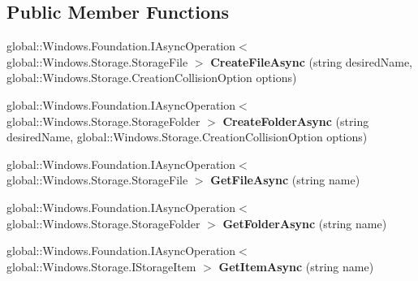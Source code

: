 \subsection*{Public Member Functions}
\begin{DoxyCompactItemize}
\item 
\mbox{\label{interface_windows_1_1_storage_1_1_i_storage_folder_adc3079d2557ccbaaea7a22907fe80ecb}} 
global\+::\+Windows.\+Foundation.\+I\+Async\+Operation$<$ global\+::\+Windows.\+Storage.\+Storage\+File $>$ {\bfseries Create\+File\+Async} (string desired\+Name, global\+::\+Windows.\+Storage.\+Creation\+Collision\+Option options)
\item 
\mbox{\label{interface_windows_1_1_storage_1_1_i_storage_folder_a2ffb245788da50cb1ed88be933be8520}} 
global\+::\+Windows.\+Foundation.\+I\+Async\+Operation$<$ global\+::\+Windows.\+Storage.\+Storage\+Folder $>$ {\bfseries Create\+Folder\+Async} (string desired\+Name, global\+::\+Windows.\+Storage.\+Creation\+Collision\+Option options)
\item 
\mbox{\label{interface_windows_1_1_storage_1_1_i_storage_folder_aedfb6354005587caee5a943d26e729e4}} 
global\+::\+Windows.\+Foundation.\+I\+Async\+Operation$<$ global\+::\+Windows.\+Storage.\+Storage\+File $>$ {\bfseries Get\+File\+Async} (string name)
\item 
\mbox{\label{interface_windows_1_1_storage_1_1_i_storage_folder_aa0b93668a8387515b51b4e00405533bc}} 
global\+::\+Windows.\+Foundation.\+I\+Async\+Operation$<$ global\+::\+Windows.\+Storage.\+Storage\+Folder $>$ {\bfseries Get\+Folder\+Async} (string name)
\item 
\mbox{\label{interface_windows_1_1_storage_1_1_i_storage_folder_a86e9de4a9052a0961a15017f936a126c}} 
global\+::\+Windows.\+Foundation.\+I\+Async\+Operation$<$ global\+::\+Windows.\+Storage.\+I\+Storage\+Item $>$ {\bfseries Get\+Item\+Async} (string name)
\item 
\mbox{\label{interface_windows_1_1_storage_1_1_i_storage_folder_af8686cb4a5545cc0060d80dfc6c15002}} 

\end{DoxyCompactItemize}
